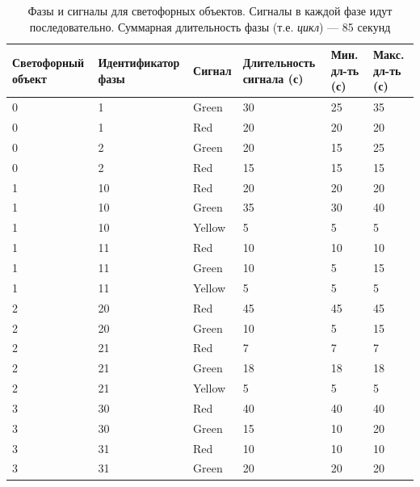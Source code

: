 \documentclass[12pt]{article}
\begin{document}
\begin{table}[h!]
\centering
\small
\caption{Фазы и сигналы для светофорных объектов. Сигналы в каждой фазе идут последовательно. Суммарная длительность фазы (т.е. \textit{цикл}) — 85 секунд}
\begin{tabular}{|p{2.6cm}|p{3.2cm}|p{1.4cm}|p{3.2cm}|p{1.5cm}|p{1.5cm}|}
\hline
\textbf{Светофорный объект} & \textbf{Идентификатор фазы} & \textbf{Сигнал} & \textbf{Длительность сигнала (с)} & \textbf{Мин. дл-ть (с)} & \textbf{Макс. дл-ть (с)} \\
\hline
0 & 1 & Green & 30 & 25 & 35 \\
0 & 1 & Red   & 20 & 20 & 20 \\
0 & 2 & Green & 20 & 15 & 25 \\
0 & 2 & Red   & 15 & 15 & 15 \\
\hline
1 & 10 & Red   & 20 & 20 & 20 \\
1 & 10 & Green & 35 & 30 & 40 \\
1 & 10 & Yellow& 5  & 5  & 5  \\
1 & 11 & Red   & 10 & 10 & 10 \\
1 & 11 & Green & 10 & 5  & 15 \\
1 & 11 & Yellow& 5  & 5  & 5  \\
\hline
2 & 20 & Red   & 45 & 45 & 45 \\
2 & 20 & Green & 10 & 5  & 15 \\
2 & 21 & Red   & 7  & 7  & 7  \\
2 & 21 & Green & 18 & 18 & 18 \\
2 & 21 & Yellow& 5  & 5  & 5  \\
\hline
3 & 30 & Red   & 40 & 40 & 40 \\
3 & 30 & Green & 15 & 10 & 20 \\
3 & 31 & Red & 10 & 10 & 10 \\
3 & 31 & Green & 20 & 20 & 20 \\
\hline
\end{tabular}
\end{table}

\newpage
\end{document}
